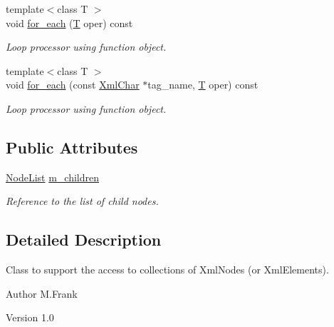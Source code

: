 \begin{DoxyCompactItemize}
{\footnotesize template$<$class T $>$ }\\void \hyperlink{class_d_d4hep_1_1_x_m_l_1_1_collection__t_a191e6f7f84a7ebe38f422a59e4227d36}{for\_\-each} (\hyperlink{class_t}{T} oper) const 
\begin{DoxyCompactList}\small\item\em Loop processor using function object. \item\end{DoxyCompactList}\item 
{\footnotesize template$<$class T $>$ }\\void \hyperlink{class_d_d4hep_1_1_x_m_l_1_1_collection__t_a5aa79a812e3248a24db7478b613b2bab}{for\_\-each} (const \hyperlink{namespace_d_d4hep_1_1_x_m_l_a09e5d9cc86ed782f6826dfe0778c1815}{XmlChar} $\ast$tag\_\-name, \hyperlink{class_t}{T} oper) const 
\begin{DoxyCompactList}\small\item\em Loop processor using function object. \item\end{DoxyCompactList}\end{DoxyCompactItemize}
\subsection*{Public Attributes}
\begin{DoxyCompactItemize}
\item 
\hyperlink{class_d_d4hep_1_1_x_m_l_1_1_node_list}{NodeList} \hyperlink{class_d_d4hep_1_1_x_m_l_1_1_collection__t_a258610612b270dbcadb7ddec5206387d}{m\_\-children}
\begin{DoxyCompactList}\small\item\em Reference to the list of child nodes. \item\end{DoxyCompactList}\end{DoxyCompactItemize}


\subsection{Detailed Description}
Class to support the access to collections of XmlNodes (or XmlElements). \begin{DoxyAuthor}{Author}
M.Frank 
\end{DoxyAuthor}
\begin{DoxyVersion}{Version}
1.0 
\end{DoxyVersion}


